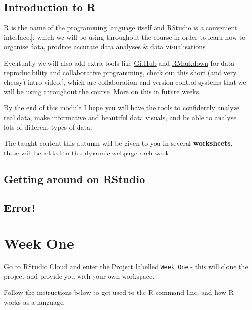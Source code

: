 \documentclass[
]{book}
\begin{document}
\hypertarget{introduction-to-r}{%
\section{Introduction to R}\label{introduction-to-r}}

\href{https://www.r-project.org/}{R} is the name of the programming language itself and \href{img/rstudio-ide.pdf}{RStudio} is a convenient interface.{]}, which we will be using throughout the course in order to learn how to organise data, produce accurate data analyses \& data visualisations.

Eventually we will also add extra tools like \href{https://www.youtube.com/watch?v=w3jLJU7DT5E}{GitHub} and \href{https://rmarkdown.rstudio.com/}{RMarkdown} for data reproducibility and collaborative programming, check out this short (and very cheesy) intro video.{]}, which are collaboration and version control systems that we will be using throughout the course. More on this in future weeks.

By the end of this module I hope you will have the tools to confidently analyze real data, make informative and beautiful data visuals, and be able to analyse lots of different types of data.

The taught content this autumn will be given to you in several \textbf{worksheets}, these will be added to this dynamic webpage each week.

\hypertarget{getting-around-on-rstudio}{%
\section{Getting around on RStudio}\label{getting-around-on-rstudio}}

\hypertarget{error}{%
\section{Error!}\label{error}}

\hypertarget{week-one}{%
\chapter{Week One}\label{week-one}}

Go to RStudio Cloud and enter the Project labelled \texttt{Week\ One} - this will clone the project and provide you with your own workspace.

Follow the instructions below to get used to the R command line, and how R works as a language.
\end{document}
